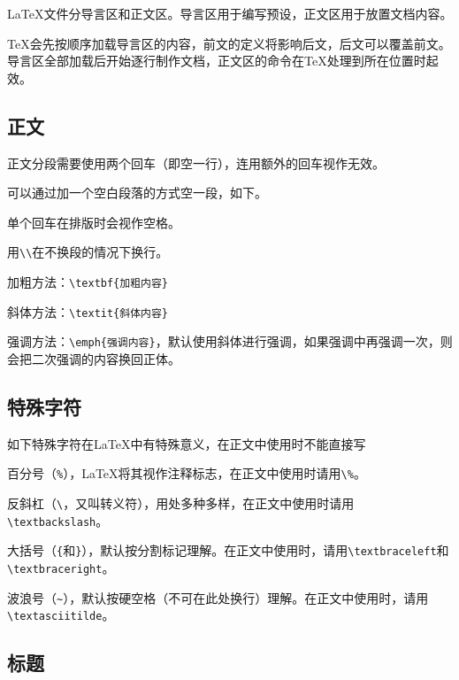 \documentclass[10pt,openany]{book}
\begin{document}
\begin{sloppypar}
    {\LaTeX}文件分导言区和正文区。导言区用于编写预设，正文区用于放置文档内容。

    

    {\TeX}会先按顺序加载导言区的内容，前文的定义将影响后文，后文可以覆盖前文。导言区全部加载后开始逐行制作文档，正文区的命令在{\TeX}处理到所在位置时起效。

    \subsection{正文}

    正文分段需要使用两个回车（即空一行），连用额外的回车视作无效。

    可以通过加一个空白段落的方式空一段，如下。

    

    单个回车在排版时会视作空格。

    用\texttt{\textbackslash{}\textbackslash{}}在不换段的情况下换行。

    加粗方法：\texttt{\textbackslash{}textbf\{加粗内容\}}

    斜体方法：\texttt{\textbackslash{}textit\{斜体内容\}}

    强调方法：\texttt{\textbackslash{}emph\{强调内容\}}，默认使用斜体进行强调，如果强调中再强调一次，则会把二次强调的内容换回正体。
    \label{bfit}

    \subsection{特殊字符}

    如下特殊字符在{\LaTeX}中有特殊意义，在正文中使用时不能直接写

    百分号（\texttt{\%}），{\LaTeX}将其视作注释标志，在正文中使用时请用\texttt{\textbackslash{}\%}。

    反斜杠（\texttt{\textbackslash{}}，又叫转义符），用处多种多样，在正文中使用时请用\texttt{\textbackslash{}textbackslash}。

    大括号（\texttt{\{}和\texttt{\}}），默认按分割标记理解。在正文中使用时，请用\texttt{\textbackslash{}textbraceleft}和\texttt{\textbackslash{}textbraceright}。

    波浪号（\texttt{\textasciitilde{}}），默认按硬空格（不可在此处换行）理解。在正文中使用时，请用\texttt{\textbackslash{}textasciitilde}。

    \subsection{标题}


\end{sloppypar}
\end{document}

